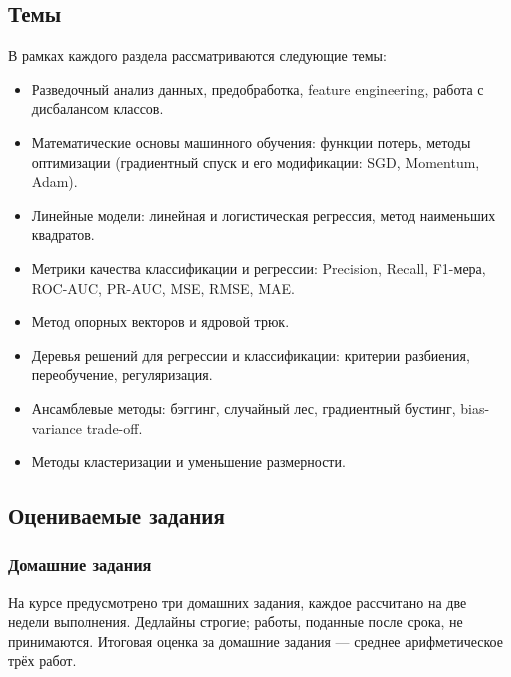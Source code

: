\subsection{Темы}

В рамках каждого раздела рассматриваются следующие темы:

\begin{itemize}
    \item Разведочный анализ данных, предобработка, feature engineering, работа с дисбалансом классов.
    \item Математические основы машинного обучения: функции потерь, методы оптимизации (градиентный спуск и его модификации: SGD, Momentum, Adam).
    \item Линейные модели: линейная и логистическая регрессия, метод наименьших квадратов.
    \item Метрики качества классификации и регрессии: Precision, Recall, F1-мера, ROC-AUC, PR-AUC, MSE, RMSE, MAE.
    \item Метод опорных векторов и ядровой трюк.
    \item Деревья решений для регрессии и классификации: критерии разбиения, переобучение, регуляризация.
    \item Ансамблевые методы: бэггинг, случайный лес, градиентный бустинг, bias-variance trade-off.
    \item Методы кластеризации и уменьшение размерности.
\end{itemize}

\subsection{Оцениваемые задания}

\subsubsection{Домашние задания}

На курсе предусмотрено три домашних задания, каждое рассчитано на две недели выполнения. Дедлайны строгие; работы, поданные после срока, не принимаются. Итоговая оценка за домашние задания --- среднее арифметическое трёх работ.

